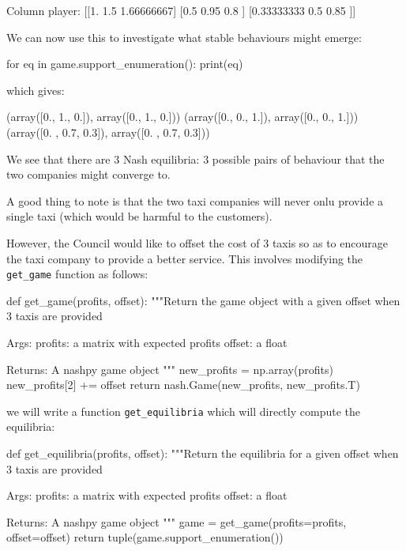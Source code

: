 \begin{itemize}
\begin{pyout}
Column player:
[[1.         1.5        1.66666667]
 [0.5        0.95       0.8       ]
 [0.33333333 0.5        0.85      ]]
\end{pyout}

We can now use this to investigate what stable behaviours might emerge:

\begin{pyin}
for eq in game.support_enumeration():
    print(eq)
\end{pyin}

which gives:

\begin{pyout}
(array([0., 1., 0.]), array([0., 1., 0.]))
(array([0., 0., 1.]), array([0., 0., 1.]))
(array([0. , 0.7, 0.3]), array([0. , 0.7, 0.3]))
\end{pyout}

We see that there are 3 Nash equilibria: 3 possible pairs of behaviour that the
two companies might converge to.

A good thing to note is that the two taxi
companies will never onlu provide a single taxi (which would be harmful to the
customers).

However, the Council would like to offset the cost of 3
taxis so as to encourage the taxi company to provide a better service. This
involves modifying the \texttt{get_game} function as follows:

\begin{pyin}
def get_game(profits, offset):
    """Return the game object with a given offset
    when 3 taxis are provided

    Args:
        profits: a matrix with expected profits
        offset: a float

    Returns:
        A nashpy game object
    """
    new_profits = np.array(profits)
    new_profits[2] += offset
    return nash.Game(new_profits, new_profits.T)
\end{pyin}

we will write a function \texttt{get_equilibria} which will directly
compute the equilibria:

\begin{pyin}
def get_equilibria(profits, offset):
    """Return the equilibria for a given offset
    when 3 taxis are provided

    Args:
        profits: a matrix with expected profits
        offset: a float

    Returns:
        A nashpy game object
    """
    game = get_game(profits=profits, offset=offset)
    return tuple(game.support_enumeration())
\end{pyin}



\end{itemize}
